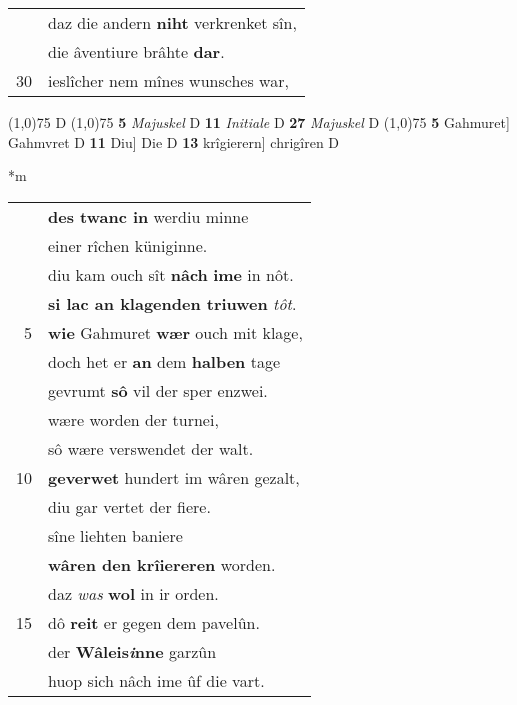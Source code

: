 \documentclass[8pt,a4paper,notitlepage]{article}
\begin{document}
\begin{table}[ht]
\begin{minipage}[t]{0.5\linewidth}
\begin{tabular}{rl}
 & daz die andern \textbf{niht} verkrenket sîn,\\ 
 & die âventiure brâhte \textbf{dar}.\\ 
30 & ieslîcher nem mînes wunsches war,\\ 
\end{tabular}
\scriptsize
\line(1,0){75} \newline
D \newline
\line(1,0){75} \newline
\textbf{5} \textit{Majuskel} D  \textbf{11} \textit{Initiale} D  \textbf{27} \textit{Majuskel} D  \newline
\line(1,0){75} \newline
\textbf{5} Gahmuret] Gahmvret D \textbf{11} Diu] Die D \textbf{13} krîgierern] chrigîren D \newline
\end{minipage}
\hspace{0.5cm}
\begin{minipage}[t]{0.5\linewidth}
\small
\begin{center}*m
\end{center}
\begin{tabular}{rl}
 & \textbf{des twanc in} werdiu minne\\ 
 & einer rîchen küniginne.\\ 
 & diu kam ouch sît \textbf{nâch} \textbf{ime} in nôt.\\ 
 & \textbf{si lac an klagenden triuwen} \textit{tôt}.\\ 
5 & \textbf{wie} Gahmuret \textbf{wær} ouch mit klage,\\ 
 & doch het er \textbf{an} dem \textbf{halben} tage\\ 
 & gevrumt \textbf{sô} vil der sper enzwei.\\ 
 & wære worden der turnei,\\ 
 & sô wære verswendet der walt.\\ 
10 & \textbf{geverwet} hundert im wâren gezalt,\\ 
 & diu gar vertet der fiere.\\ 
 & sîne liehten baniere\\ 
 & \textbf{wâren den krîiereren} worden.\\ 
 & daz \textit{was} \textbf{wol} in ir orden.\\ 
15 & dô \textbf{reit} er gegen dem pavelûn.\\ 
 & der \textbf{Wâleis\textit{i}nne} garzûn\\ 
 & huop sich nâch ime ûf die vart.\\ 

\end{tabular}
\end{minipage}
\end{table}
\end{document}
